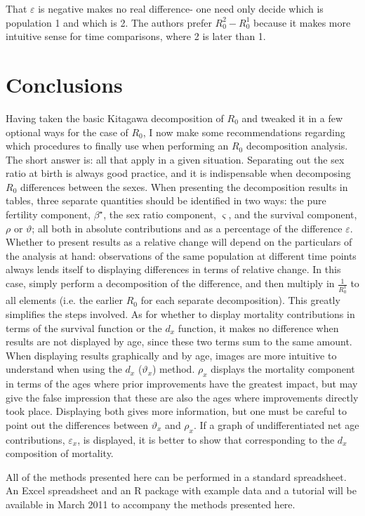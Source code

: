 \documentclass{article}
\begin{document}
That $\varepsilon$ is negative makes no real difference- one need only decide which is population 1 and which is 2. The authors prefer $R_{0}^{2}-R_{0}^{1}$ because it makes more intuitive sense for time comparisons, where 2 is later than 1.

\section*{Conclusions}
Having taken the basic Kitagawa decomposition of $R_{0}$ and tweaked it in a few optional ways for the case of $R_{0}$, I now make some recommendations regarding which procedures to finally use when performing an $R_{0}$ decomposition analysis. The short answer is: all that apply in a given situation. Separating out the sex ratio at birth is always good practice, and it is indispensable when decomposing $R_{0}$ differences between the sexes. When presenting the decomposition results in tables, three separate quantities should be identified in two ways: the pure fertility component, $\beta^{\star}$, the sex ratio component, $\varsigma$, and the survival component, $\rho$ or $\vartheta$; all both in absolute contributions and as a percentage of the difference $\varepsilon$. Whether to present results as a relative change will depend on the particulars of the analysis at hand: observations of the same population at different time points always lends itself to displaying differences in terms of relative change. In this case, simply perform a decomposition of the difference, and then multiply in $\frac{1}{R_{0}^{1}}$ to all elements (i.e. the earlier $R_{0}$ for each separate decomposition). This greatly simplifies the steps involved. As for whether to display mortality contributions in terms of the survival function or the $d_{x}$ function, it makes no difference when results are not displayed by age, since these two terms sum to the same amount. When displaying results graphically and by age, images are more intuitive to understand when using the $d_{x}$ ($\vartheta_{x}$) method. $\rho_{x}$ displays the mortality component in terms of the ages where prior improvements have the greatest impact, but may give the false impression that these are also the ages where improvements directly took place. Displaying both gives more information, but one must be careful to point out the differences between $\vartheta_{x}$ and $\rho_{x}$. If a graph of undifferentiated net age contributions, $\varepsilon_{x}$, is displayed, it is better to show that corresponding to the $d_{x}$ composition of mortality. 

All of the methods presented here can be performed in a standard spreadsheet. An Excel spreadsheet and an R package with example data and a tutorial will be available in March 2011 to accompany the methods presented here.



\end{document}

